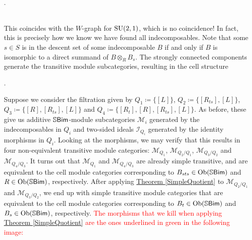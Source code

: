 \begin{example}
\begin{center}
\end{center}
\begin{center}
\noindent\\[-2\linespacing]\qquad\qquad\qquad\qquad\qquad\qquad\qquad\qquad\qquad\qquad\qquad.
\end{center}
\noindent\\[5\linespacing] This coincides with the $W$-graph for $\textup{SU}(2, 1)$, which is no coincidence! In fact, this is precisely how we know we have found all indecomposables. Note that some $s \in S$ is in the descent set of some indecomposable $B$ if and only if $B$ is isomorphic to a direct summand of $B \otimes_R B_s$. The strongly connected components generate the transitive module subcategories, resulting in the cell structure\filbreak
\begin{center}
.
\end{center}
\noindent Suppose we consider the filtration given by $Q_1 \coloneqq \{[L]\}$, $Q_2 \coloneqq \{[R_{ts}], [L]\}$, $Q_3 \coloneqq \{[R], [R_{ts}], [L]\}$ and $Q_4 \coloneqq \{[R_t], [R], [R_{ts}], [L]\}$. As before, these give us additive $\mathbb{S}\textnormal{\textsf{Bim}}$-module subcategories $\mathcal{M}_i$ generated by the indecomposables in $Q_i$ and two-sided ideals $\mathcal{I}_{Q_i}$ generated by the identity morphisms in $Q_i$. Looking at the morphisms, we may verify that this results in four non-equivalent transitive module categories: $\mathcal{M}_{Q_1}$, $\mathcal{M}_{Q_2/Q_1}$, $\mathcal{M}_{Q_3/Q_2}$ and $\mathcal{M}_{Q_4/Q_3}$. It turns out that $\mathcal{M}_{Q_1}$ and $\mathcal{M}_{Q_4/Q_3}$ are already simple transitive, and are equivalent to the cell module categories corresponding to $B_{sts} \in \textnormal{Ob}(\mathbb{S}\textnormal{\textsf{Bim}})$ and $R \in \textnormal{Ob}(\mathbb{S}\textnormal{\textsf{Bim}})$, respectively. After applying \hyperref[SimpleQuotient]{Theorem \ref*{SimpleQuotient}} to $\mathcal{M}_{Q_2/Q_1}$ and $\mathcal{M}_{Q_3/Q_2}$, we end up with simple transitive module categories that are equivalent to the cell module categories corresponding to $B_t \in \textnormal{Ob}(\mathbb{S}\textnormal{\textsf{Bim}})$ and $B_s \in \textnormal{Ob}(\mathbb{S}\textnormal{\textsf{Bim}})$, respectively. \textcolor{red}{The morphisms that we kill when applying \hyperref[SimpleQuotient]{Theorem \ref*{SimpleQuotient}} are the ones underlined in green in the following image:}\\

\end{example}
